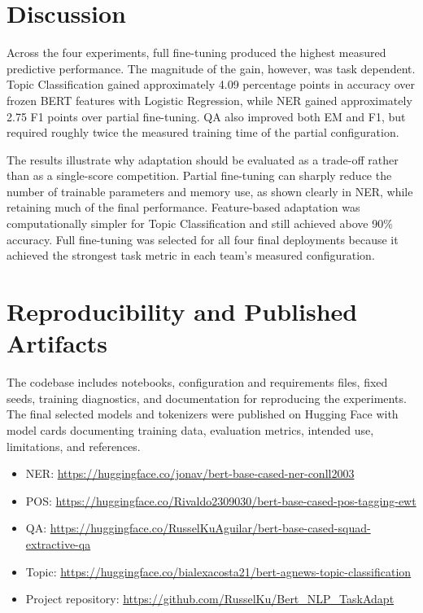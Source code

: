 \documentclass[conference]{IEEEtran}
\begin{document}
\section{Discussion}
Across the four experiments, full fine-tuning produced the highest measured predictive performance. The magnitude of the gain, however, was task dependent. Topic Classification gained approximately 4.09 percentage points in accuracy over frozen BERT features with Logistic Regression, while NER gained approximately 2.75 F1 points over partial fine-tuning. QA also improved both EM and F1, but required roughly twice the measured training time of the partial configuration.

The results illustrate why adaptation should be evaluated as a trade-off rather than as a single-score competition. Partial fine-tuning can sharply reduce the number of trainable parameters and memory use, as shown clearly in NER, while retaining much of the final performance. Feature-based adaptation was computationally simpler for Topic Classification and still achieved above 90\% accuracy. Full fine-tuning was selected for all four final deployments because it achieved the strongest task metric in each team's measured configuration.

\section{Reproducibility and Published Artifacts}
The codebase includes notebooks, configuration and requirements files, fixed seeds, training diagnostics, and documentation for reproducing the experiments. The final selected models and tokenizers were published on Hugging Face with model cards documenting training data, evaluation metrics, intended use, limitations, and references.

\begin{itemize}[leftmargin=*]
    \item NER: \url{https://huggingface.co/jonav/bert-base-cased-ner-conll2003}
    \item POS: \url{https://huggingface.co/Rivaldo2309030/bert-base-cased-pos-tagging-ewt}
    \item QA: \url{https://huggingface.co/RusselKuAguilar/bert-base-cased-squad-extractive-qa}
    \item Topic: \url{https://huggingface.co/bialexacosta21/bert-agnews-topic-classification}
    \item Project repository: \url{https://github.com/RusselKu/Bert_NLP_TaskAdapt}
\end{itemize}
\end{document}

